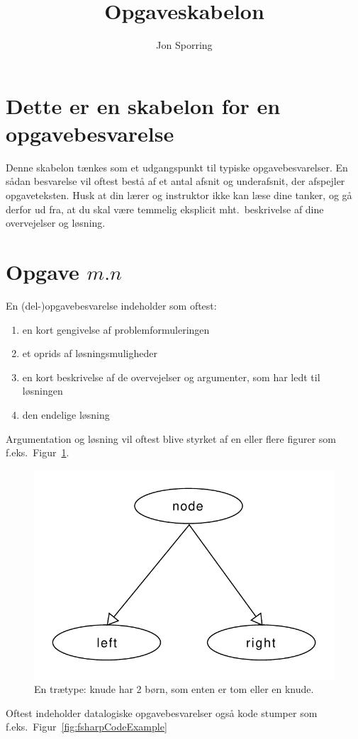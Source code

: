\documentclass[a4paper]{article}
\title{Opgaveskabelon}
\author{Jon Sporring }
\begin{document}
\maketitle %

\section{Dette er en skabelon for en opgavebesvarelse}
Denne skabelon tænkes som et udgangspunkt til typiske opgavebesvarelser. En sådan besvarelse vil oftest bestå af et antal afsnit og underafsnit, der afspejler opgaveteksten. Husk at din lærer og instruktor ikke kan læse dine tanker, og gå derfor ud fra, at du skal være temmelig eksplicit mht.\ beskrivelse af dine overvejelser og løsning.

\section*{Opgave $m.n$}
En (del-)opgavebesvarelse indeholder som oftest:
\begin{enumerate}
\item en kort gengivelse af problemformuleringen
\item et oprids af løsningsmuligheder
\item en kort beskrivelse af de overvejelser og argumenter, som har ledt til løsningen
\item den endelige løsning
\end{enumerate}
Argumentation og løsning vil oftest blive styrket af en eller flere figurer som f.eks.\ Figur~\ref{fig:eksempel}.
\begin{figure}
  \centering
  \includegraphics[width=0.6\linewidth]{treeNode} %
  \caption{En trætype: knude har 2 børn, som enten er tom eller en knude.}
  \label{fig:eksempel}
\end{figure}
Oftest indeholder datalogiske opgavebesvarelser også kode stumper som f.eks.\ Figur~\ref{fig:fsharpCodeExample}
\end{document}

